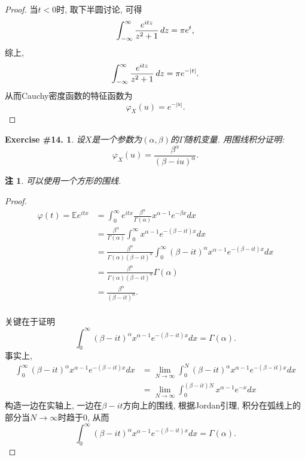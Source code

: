 \documentclass[UTF8, a4paper]{article}
\newtheorem{exercise}{Exercise \#14.}
\newtheorem*{remark}{注}
\begin{document}
\begin{proof}
当\(t < 0\)时, 取下半圆讨论, 可得
$$
{\displaystyle \int _{-\infty }^{\infty }{e^{itz} \over z^{2}+1}\,dz=\pi e^{t},}
$$
综上, 
$$
{\displaystyle \int _{-\infty }^{\infty }{e^{itz} \over z^{2}+1}\,dz=\pi e^{-\left|t\right|}.}
$$
从而Cauchy密度函数的特征函数为
$$
\varphi_X(u) = e^{-|u|}.
$$

\end{proof}


\begin{framed}
\begin{exercise}
设\(X\)是一个参数为\((\alpha, \beta)\)的\(\Gamma\)随机变量. 
用围线积分证明: 
$$
\varphi_X(u) = \frac{\beta^\alpha}{(\beta - iu)^\alpha}.
$$
\end{exercise}
\end{framed}
\begin{remark}
可以使用一个方形的围线.
\end{remark}


\begin{proof}
$$
\begin{aligned}
\varphi(t)=\mathbb{E} e^{i t x} & =\int_0^\infty e^{i t x} \frac{\beta^\alpha}{\Gamma(\alpha)} x^{\alpha-1} e^{-\beta x} d x \\
& =\frac{\beta^\alpha}{\Gamma(\alpha)} \int_0^\infty x^{\alpha-1} e^{-(\beta-i t) x} d x \\
& =\frac{\beta^\alpha}{\Gamma(\alpha)(\beta-i t)^\alpha} \int_0^\infty(\beta-i t)^\alpha x^{\alpha-1} e^{-(\beta-i t) x} d x \\
& =\frac{\beta^\alpha}{\Gamma(\alpha)(\beta-i t)^\alpha} \Gamma(\alpha) \\
& =\frac{\beta^\alpha}{(\beta-i t)^\alpha}. \\
\end{aligned}
$$

关键在于证明
$$
\int_0^\infty(\beta-i t)^\alpha x^{\alpha-1} e^{-(\beta-i t) x} d x = \Gamma(\alpha).
$$
事实上, 
$$
\begin{aligned}
\int_0^{\infty}(\beta-i t)^\alpha x^{\alpha-1} e^{-(\beta-i t) x} d x & =\lim _{N \rightarrow \infty} \int_0^N(\beta-i t)^\alpha x^{\alpha-1} e^{-(\beta-i t) x} d x \\
& =\lim _{N \rightarrow \infty} \int_0^{(\beta-i t) N} x^{\alpha-1} e^{-x} d x
\end{aligned}
$$
构造一边在实轴上, 一边在\(\beta-it\)方向上的围线, 根据Jordan引理, 积分在弧线上的部分当\(N\to\infty\)时趋于\(0\), 从而
$$
\int_0^{\infty}(\beta-i t)^\alpha x^{\alpha-1} e^{-(\beta-i t) x} d x = \Gamma(\alpha).
$$
\end{proof}
\end{document}
